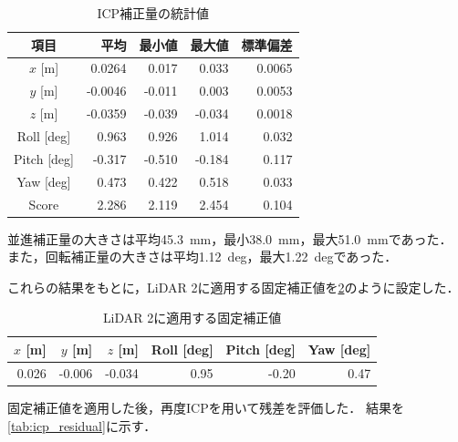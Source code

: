 \begin{table}[tb]
    \centering
    \caption{ICP補正量の統計値}
    \label{tab:icp_correction_stats}
    \begin{tabular}{c|rrrr}
        \hline
        項目 & 平均 & 最小値 & 最大値 & 標準偏差 \\
        \hline
        $x$ [m]       &  0.0264 &  0.017 &  0.033 & 0.0065 \\
        $y$ [m]       & -0.0046 & -0.011 &  0.003 & 0.0053 \\
        $z$ [m]       & -0.0359 & -0.039 & -0.034 & 0.0018 \\
        Roll [deg]    &  0.963  &  0.926 &  1.014 & 0.032  \\
        Pitch [deg]   & -0.317  & -0.510 & -0.184 & 0.117  \\
        Yaw [deg]     &  0.473  &  0.422 &  0.518 & 0.033  \\
        Score         &  2.286  &  2.119 &  2.454 & 0.104  \\
        \hline
    \end{tabular}
\end{table}

並進補正量の大きさは平均45.3~mm，最小38.0~mm，最大51.0~mmであった．
また，回転補正量の大きさは平均1.12~deg，最大1.22~degであった．

これらの結果をもとに，LiDAR 2に適用する固定補正値を\cref{tab:fixed_correction}のように設定した．

\begin{table}[tb]
    \centering
    \caption{LiDAR 2に適用する固定補正値}
    \label{tab:fixed_correction}
    \begin{tabular}{rrr|rrr}
        \hline
        $x$ [m] & $y$ [m] & $z$ [m] & Roll [deg] & Pitch [deg] & Yaw [deg] \\
        \hline
        0.026 & -0.006 & -0.034 & 0.95 & -0.20 & 0.47 \\
        \hline
    \end{tabular}
\end{table}

固定補正値を適用した後，再度ICPを用いて残差を評価した．
結果を\cref{tab:icp_residual}に示す．

